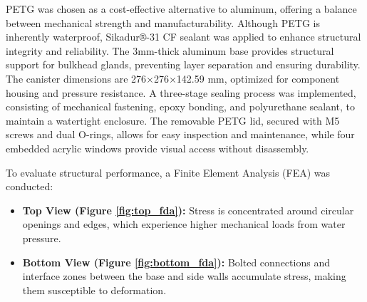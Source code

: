 PETG was chosen as a cost-effective alternative to aluminum, offering a balance between mechanical strength and manufacturability. Although PETG is inherently waterproof, Sikadur®-31 CF sealant was applied to enhance structural integrity and reliability. The 3mm-thick aluminum base provides structural support for bulkhead glands, preventing layer separation and ensuring durability. The canister dimensions are 276×276×142.59 mm, optimized for component housing and pressure resistance. A three-stage sealing process was implemented, consisting of mechanical fastening, epoxy bonding, and polyurethane sealant, to maintain a watertight enclosure. The removable PETG lid, secured with M5 screws and dual O-rings, allows for easy inspection and maintenance, while four embedded acrylic windows provide visual access without disassembly.

\hspace{10pt} To evaluate structural performance, a Finite Element Analysis (FEA) was conducted:

\vspace{-0.5\baselineskip}
\begin{itemize}
    \setlength{\itemsep}{0pt}
    \item \textbf{Top View (Figure \ref{fig:top_fda}):} Stress is concentrated around circular openings and edges, which experience higher mechanical loads from water pressure.
    \item \textbf{Bottom View (Figure \ref{fig:bottom_fda}):} Bolted connections and interface zones between the base and side walls accumulate stress, making them susceptible to deformation.
\end{itemize}

